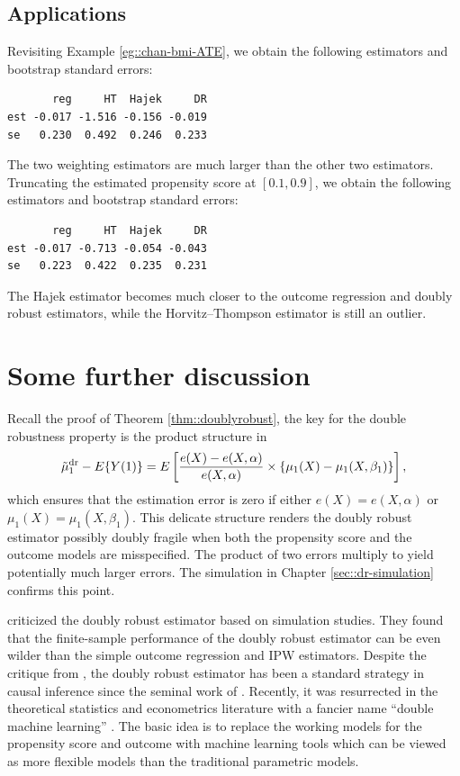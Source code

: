 \subsection{Applications}
\label{sec::ATE-application}




Revisiting Example \ref{eg::chan-bmi-ATE}, we obtain the following estimators and bootstrap standard errors:
\begin{lstlisting}
       reg     HT  Hajek     DR
est -0.017 -1.516 -0.156 -0.019
se   0.230  0.492  0.246  0.233
\end{lstlisting}
The two weighting estimators are much larger than the other two estimators. Truncating the estimated propensity score at $[0.1, 0.9]$, we obtain the following estimators and bootstrap standard errors:
\begin{lstlisting}
       reg     HT  Hajek     DR
est -0.017 -0.713 -0.054 -0.043
se   0.223  0.422  0.235  0.231
\end{lstlisting}
The Hajek estimator becomes much closer to the outcome regression and doubly robust estimators, while the Horvitz--Thompson estimator is still an outlier. 



\section{Some further discussion}



Recall the proof of Theorem \ref{thm::doublyrobust}, the key for the double robustness property is the product structure in 
$$
\tilde{\mu}_1^\textup{dr} - E\{  Y(1) \} 
= E\left[   \frac{e(X) - e(X,\alpha) }{  e(X,\alpha) }  \times  \left\{  \mu_1(X) -  \mu_1(X, \beta_1)   \right\} \right] ,
$$
which ensures that the estimation error is zero if either $e(X) = e(X,\alpha) $ or $ \mu_1(X) =  \mu_1(X, \beta_1) $. This delicate structure renders the doubly robust estimator possibly doubly fragile when both the propensity score and the outcome models are misspecified. The product of two errors multiply to yield potentially much larger errors. 
The simulation in Chapter \ref{sec::dr-simulation} confirms this point. 


\citet{kang2007demystifying} criticized the doubly robust estimator based on simulation studies. They found that the finite-sample performance of the doubly robust estimator can be even wilder than the simple outcome regression and IPW estimators. 
Despite the critique from \citet{kang2007demystifying},  the doubly robust estimator has been a standard strategy in causal inference since the seminal work of \citet{scharfstein1999adjusting}. Recently, it was resurrected in the theoretical statistics and econometrics literature with a fancier name ``double machine learning'' \citep{chernozhukov2018double}. The basic idea is to replace the working models for the propensity score and outcome with machine learning tools which can be viewed as more flexible models than the traditional parametric models. 





